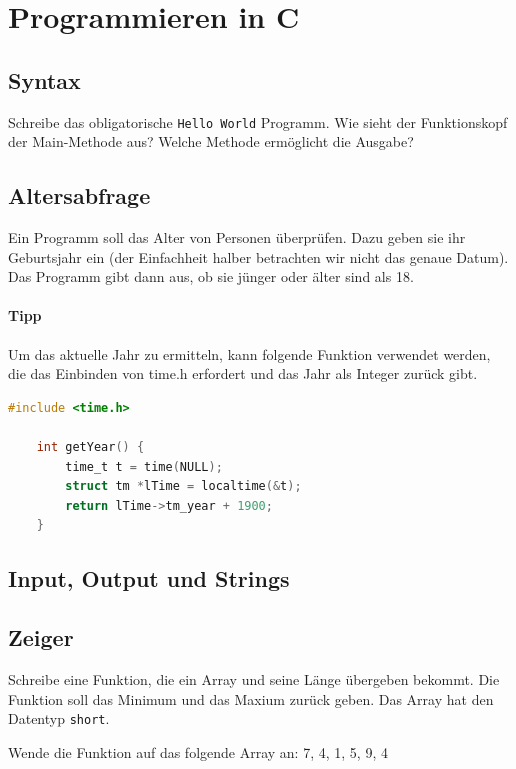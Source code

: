 \documentclass[11pt, a4paper]{article}
\begin{document}
\newpage
\section{Programmieren in C}
\subsection{Syntax}
Schreibe das obligatorische \texttt{Hello World} Programm. Wie sieht der Funktionskopf der Main-Methode aus? Welche Methode ermöglicht die Ausgabe?

\subsection{Altersabfrage}
Ein Programm soll das Alter von Personen überprüfen. Dazu geben sie ihr Geburtsjahr ein (der Einfachheit halber betrachten wir nicht das genaue Datum). Das Programm gibt dann aus, ob sie jünger oder älter sind als 18.

\paragraph{Tipp} Um das aktuelle Jahr zu ermitteln, kann folgende Funktion verwendet werden, die das Einbinden von time.h erfordert und das Jahr als Integer zurück gibt.
\begin{lstlisting}[language=C]
	#include <time.h>

	int getYear() {
		time_t t = time(NULL);
		struct tm *lTime = localtime(&t);
		return lTime->tm_year + 1900;
	}
\end{lstlisting}

\subsection{Input, Output und Strings}

\subsection{Zeiger}
\label{zeigerAufgabe}
Schreibe eine Funktion, die ein Array und seine Länge übergeben bekommt. Die Funktion soll das Minimum und das Maxium zurück geben. Das Array hat den Datentyp \texttt{short}.

Wende die Funktion auf das folgende Array an:
7, 4, 1, 5, 9, 4
\end{document}

